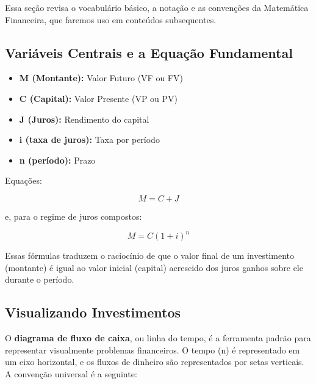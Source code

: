 \documentclass[
  a4paper,
]{book}
\providecommand{\tightlist}{%
  \setlength{\itemsep}{0pt}\setlength{\parskip}{0pt}}\usepackage{longtable,booktabs,array}
\begin{document}
\begin{tcolorbox}[enhanced jigsaw, opacityback=0, breakable, bottomrule=.15mm, left=2mm, bottomtitle=1mm, colback=white, leftrule=.75mm, toptitle=1mm, title=\textcolor{quarto-callout-note-color}{\faInfo}\hspace{0.5em}{Linguagem da Matemática Financeira}, colbacktitle=quarto-callout-note-color!10!white, opacitybacktitle=0.6, coltitle=black, titlerule=0mm, rightrule=.15mm, colframe=quarto-callout-note-color-frame, arc=.35mm, toprule=.15mm]

Essa seção revisa o vocabulário básico, a notação e as convenções da
Matemática Financeira, que faremos uso em conteúdos subsequentes.

\subsection*{Variáveis Centrais e a Equação
Fundamental}\label{variuxe1veis-centrais-e-a-equauxe7uxe3o-fundamental}

\begin{itemize}
\tightlist
\item
  \textbf{M (Montante):} Valor Futuro (VF ou FV)
\item
  \textbf{C (Capital):} Valor Presente (VP ou PV)
\item
  \textbf{J (Juros):} Rendimento do capital
\item
  \textbf{i (taxa de juros):} Taxa por período
\item
  \textbf{n (período):} Prazo
\end{itemize}

\vspace{0.5cm}

Equações:

\[
M = C + J
\]

e, para o regime de juros compostos:

\[
M = C (1 + i)^n
\]

Essas fórmulas traduzem o raciocínio de que o valor final de um
investimento (montante) é igual ao valor inicial (capital) acrescido dos
juros ganhos sobre ele durante o período.

\subsection*{Visualizando
Investimentos}\label{visualizando-investimentos}

O \textbf{diagrama de fluxo de caixa}, ou linha do tempo, é a ferramenta
padrão para representar visualmente problemas financeiros. O tempo (n) é
representado em um eixo horizontal, e os fluxos de dinheiro são
representados por setas verticais. A convenção universal é a seguinte:


\end{tcolorbox}
\end{document}
